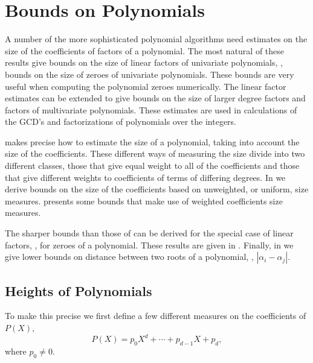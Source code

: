\chapter{Bounds on Polynomials}
\label{PBounds:Chap}


A number of the more sophisticated polynomial algorithms need
estimates on the size of the coefficients of factors of a polynomial.
The most natural of these results give bounds on the size of linear
factors of univariate polynomials, \ie, bounds on the size of zeroes
of univariate polynomials.  These bounds are very useful when
computing the polynomial zeroes numerically.  The linear factor
estimates can be extended to give bounds on the size of larger degree
factors and factors of multivariate polynomials.  These estimates are
used in calculations of the GCD's and factorizations of polynomials
over the integers.

 makes precise how to estimate the size of a
polynomial, taking into account the size of the coefficients.  These
different ways of measuring the size divide into two different
classes, those that give equal weight to all of the coefficients and
those that give different weights to coefficients of terms of
differing degrees.  In  we derive bounds
on the size of the coefficients based on unweighted, or uniform, size
measures.   presents some bounds that
make use of weighted coefficients size measures.  

The sharper bounds than those of  can be
derived for the special case of linear factors, \ie, for zeroes of a
polynomial.  These results are given in .
Finally, in  we give lower bounds on
distance between two roots of a polynomial, \ie, $|\alpha_i - \alpha_j|$.

\section{Heights of Polynomials}
\label{PB:Heights:Sec}

To make this precise we first define a few different measures on the
coefficients of $P(X)$, 
\begin{equation}\label{PA:p:Def:Eq}
P(X) = p_0 X^d + \cdots + p_{d-1} X + p_d,
\end{equation}
where $p_0 \not= 0$.

